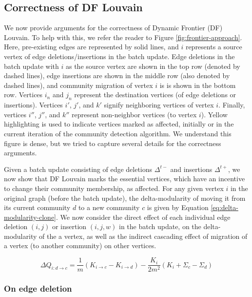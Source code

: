 \subsection{Correctness of DF Louvain}
\label{sec:louvain-correctness}

We now provide arguments for the correctness of Dynamic Frontier (DF) Louvain. To help with this, we refer the reader to Figure \ref{fig:frontier-approach}. Here, pre-existing edges are represented by solid lines, and $i$ represents a source vertex of edge deletions/insertions in the batch update. Edge deletions in the batch update with $i$ as the source vertex are shown in the top row (denoted by dashed lines), edge insertions are shown in the middle row (also denoted by dashed lines), and community migration of vertex $i$ is is shown in the bottom row. Vertices $i_n$ and $j_n$ represent the destination vertices (of edge deletions or insertions). Vertices $i'$, $j'$, and $k'$ signify neighboring vertices of vertex $i$. Finally, vertices $i''$, $j''$, and $k''$ represent non-neighbor vertices (to vertex $i$). Yellow highlighting is used to indicate vertices marked as affected, initially or in the current iteration of the community detection algorithm. We understand this figure is dense, but we tried to capture several details for the correctness arguments.

Given a batch update consisting of edge deletions $\Delta^{t-}$ and insertions $\Delta^{t+}$, we now show that DF Louvain marks the essential vertices, which have an incentive to change their community membership, as affected. For any given vertex $i$ in the original graph (before the batch update), the delta-modularity of moving it from its current community $d$ to a new community $c$ is given by Equation \ref{eq:delta-modularity-clone}. We now consider the direct effect of each individual edge deletion $(i, j)$ or insertion $(i, j, w)$ in the batch update, on the delta-modularity of the a vertex, as well as the indirect cascading effect of migration of a vertex (to another community) on other vertices.

\begin{equation}
\label{eq:delta-modularity-clone}
  \Delta Q_{i: d \rightarrow c}
  = \frac{1}{m} (K_{i \rightarrow c} - K_{i \rightarrow d}) - \frac{K_i}{2m^2} (K_i + \Sigma_c - \Sigma_d)
\end{equation}






\subsubsection{On edge deletion}

